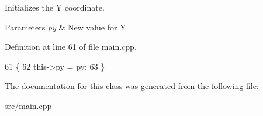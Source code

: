 Initializes the Y coordinate. 


\begin{DoxyParams}{Parameters}
{\em py} & New value for Y \\
\hline
\end{DoxyParams}


Definition at line 61 of file main.\+cpp.


\begin{DoxyCode}
61                       \{
62         this->py = py;
63     \}
\end{DoxyCode}


The documentation for this class was generated from the following file\+:\begin{DoxyCompactItemize}
\item 
src/\hyperlink{main_8cpp}{main.\+cpp}\end{DoxyCompactItemize}
